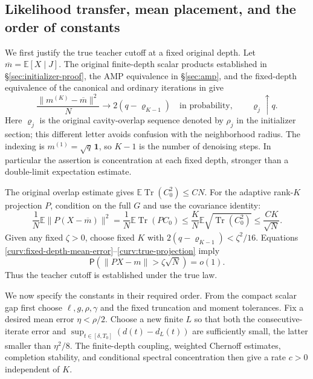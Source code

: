 \documentclass[11pt,reqno]{amsart}
\begin{document}
\subsection{Likelihood transfer, mean placement, and the order of constants}
\label{curv:likelihood-transfer}

We first justify the true teacher cutoff at a fixed original depth.
Let $\overline m=\mathbb E[X\mid J]$. The original finite-depth scalar
products established in \S\ref{sec:initializer-proof}, the AMP equivalence in
\S\ref{sec:amp}, and the fixed-depth equivalence of the canonical
and ordinary iterations in \cite[Section 4]{brennecke2023operator} give
\begin{equation}\label{curv:fixed-depth-mean-error}
 \frac{\|m^{(K)}-\overline m\|^2}{N}
                  \longrightarrow 2(q-\varrho_{K-1})
                  \quad\text{in probability},\qquad
                         \varrho_j\uparrow q.
\end{equation}
Here $\varrho_j$ is the original cavity-overlap sequence denoted by
$\rho_j$ in the initializer section; this different letter avoids
confusion with the neighborhood radius. The indexing is
$m^{(1)}=\sqrt q\,\mathbf1$, so $K-1$ is the number of denoising steps.
In particular the assertion is concentration at each fixed depth,
stronger than a double-limit expectation estimate.

The original overlap estimate gives
$\mathbb E\operatorname{Tr}(C_0^2)\le C N$. For the adaptive rank-$K$
projection $P$, condition on the full $G$ and use the covariance identity:
\begin{equation}\label{curv:true-projection}
 \frac1N\mathbb E\|P(X-\overline m)\|^2
    =\frac1N\mathbb E\operatorname{Tr}(PC_0)
    \le\frac K N\mathbb E\sqrt{\operatorname{Tr}(C_0^2)}
    \le\frac{CK}{\sqrt N}.
\end{equation}
Given any fixed $\zeta>0$, choose fixed $K$ with
$2(q-\varrho_{K-1})<\zeta^2/16$. Equations
\eqref{curv:fixed-depth-mean-error}--\eqref{curv:true-projection} imply
\begin{equation}\label{curv:true-cutoff}
                  \mathsf P(\|PX-m\|>\zeta\sqrt N)=o(1).
\end{equation}
Thus the teacher cutoff is established under the true law.

We now specify the constants in their required order. From the compact
scalar gap first choose $\ell,g,\rho,\gamma$ and the fixed truncation
and moment tolerances. Fix a desired mean error $\eta<\rho/2$. Choose a
new finite $L$ so that both the consecutive-iterate error and
$\sup_{t\in[\delta,T_0]}(d(t)-d_L(t))$ are sufficiently small, the
latter smaller than $\eta^2/8$. The finite-depth coupling, weighted
Chernoff estimates, completion stability, and conditional spectral
concentration then give a rate $c>0$ independent of $K$.
\end{document}
